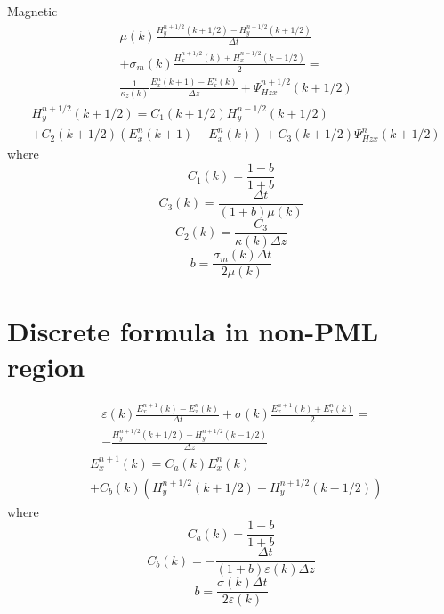 \documentclass[a4paper,10pt]{article}
\begin{document}
Magnetic
\begin{equation}
\begin{aligned}
&\mu(k)\frac{H^{n+1/2}_{y}(k+1/2)-H^{n+1/2}_{y}(k+1/2)}{\Delta t}\\
&+\sigma_m(k)\frac{H^{n+1/2}_{x}(k)+H^{n-1/2}_{x}(k+1/2)}{2}=\\
&\frac{1}{\kappa_z(k)}\frac{E^{n}_{x}(k+1)-E^{n}_{x}(k)}{\Delta z}+\Psi_{Hzx}^{n+1/2}(k+1/2)
\end{aligned}
\end{equation}
\begin{equation}
\begin{aligned}
&H^{n+1/2}_{y}(k+1/2)=C_{1}(k+1/2)H^{n-1/2}_{y}(k+1/2)\\
&+C_{2}(k+1/2)\left(E^{n}_{x}(k+1)-E^{n}_{x}(k)\right)+C_{3}(k+1/2)\Psi_{Hzx}^{n}(k+1/2)
\end{aligned}
\end{equation}
where 
\begin{equation}
C_{1}(k)=\frac{1-b}{1+b}
\end{equation}
\begin{equation}
C_{3}(k)=\frac{\Delta t}{(1+b)\mu(k)}
\end{equation}
\begin{equation}
C_{2}(k)=\frac{C_{3}}{\kappa(k)\Delta z}
\end{equation}
\begin{equation}
b=\frac{\sigma_m(k)\Delta t}{2\mu(k)}
\end{equation}

\section{Discrete formula in non-PML region}
\begin{equation}
\begin{aligned}
&\varepsilon(k)\frac{E^{n+1}_{x}(k)-E^{n}_{x}(k)}{\Delta t}+\sigma(k)\frac{E^{n+1}_{x}(k)+E^{n}_{x}(k)}{2}=\\
&-\frac{H^{n+1/2}_{y}(k+1/2)-H^{n+1/2}_{y}(k-1/2)}{\Delta z}
\end{aligned}
\end{equation}
\begin{equation}
\begin{aligned}
&E^{n+1}_{x}(k)=C_{a}(k)E^{n}_{x}(k)\\
&+C_{b}(k)\left(H^{n+1/2}_{y}(k+1/2)-H^{n+1/2}_{y}(k-1/2)\right)
\end{aligned}
\end{equation}
where 
\begin{equation}
C_{a}(k)=\frac{1-b}{1+b}
\end{equation}
\begin{equation}
C_{b}(k)=-\frac{\Delta t}{(1+b)\varepsilon(k)\Delta z}
\end{equation}
\begin{equation}
b=\frac{\sigma(k)\Delta t}{2\varepsilon(k)}
\end{equation}
\end{document}
